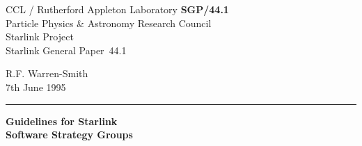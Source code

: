 \documentclass[11pt]{article}
\newcommand{\stardoccategory}  {Starlink General Paper}
\newcommand{\stardocinitials}  {SGP}
\newcommand{\stardocnumber}    {44.1}
\newcommand{\stardocauthors}   {R.F. Warren-Smith}
\newcommand{\stardocdate}      {7th June 1995}
\newcommand{\stardoctitle}     {Guidelines for Starlink\\
                                Software Strategy Groups}
\newcommand{\stardocname}{\stardocinitials /\stardocnumber}
\newenvironment{latexonly}{}{}
\begin{document}
\thispagestyle{empty}

\begin{latexonly}
   CCL / {\sc Rutherford Appleton Laboratory} \hfill {\bf \stardocname}\\
   {\large Particle Physics \& Astronomy Research Council}\\
   {\large Starlink Project\\}
   {\large \stardoccategory\ \stardocnumber}
   \begin{flushright}
   \stardocauthors\\
   \stardocdate
   \end{flushright}
   \vspace{-4mm}
   \rule{\textwidth}{0.5mm}
   \vspace{5mm}
   \begin{center}
   {\Large\bf \stardoctitle}
   \end{center}
   \vspace{5mm}

\end{latexonly}
\end{document}
